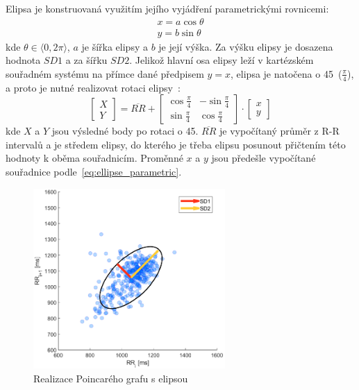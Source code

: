 Elipsa je konstruovaná využitím jejího vyjádření parametrickými rovnicemi:
\begin{gather}
    \label{eq:ellipse_parametric}
    x = a \cos \theta \nonumber \\
    y = b \sin \theta
\end{gather}
kde $\theta \in \langle 0, 2\pi \rangle$, $a$ je šířka elipsy a $b$ je její
výška. Za výšku elipsy je dosazena hodnota $SD1$ a za šířku $SD2$. Jelikož
hlavní osa elipsy leží v kartézském souřadném systému na přímce dané předpisem
$y=x$, elipsa je natočena o 45\degree~($\frac{\pi}{4}$), a proto je nutné
realizovat rotaci elipsy~\cite{Mazhar2007}:
\begin{equation}
    \begin{bmatrix}
        X \\
        Y
    \end{bmatrix}
    =
    \overline{RR} +
    \begin{bmatrix}
        \cos \frac{\pi}{4} & -\sin \frac{\pi}{4} \\
        \sin \frac{\pi}{4} & \cos \frac{\pi}{4}
    \end{bmatrix}
    \cdot
    \begin{bmatrix}
        x \\
        y
    \end{bmatrix}
\end{equation}
kde $X$ a $Y$ jsou výsledné body po rotaci o 45\degree. $\overline{RR}$ je
vypočítaný průměr z R-R intervalů a je středem elipsy, do kterého je třeba
elipsu posunout přičtením této hodnoty k oběma souřadnicím. Proměnné $x$ a $y$
jsou předešle vypočítané souřadnice podle~\ref{eq:ellipse_parametric}.

\begin{figure}[h]
    \begin{center}
        \includegraphics[width=0.65\textwidth]{../assets/figures/my_poincare}
        \caption{Realizace Poincarého grafu s elipsou}
        \label{fig:my_poincare}
    \end{center}
\end{figure}

